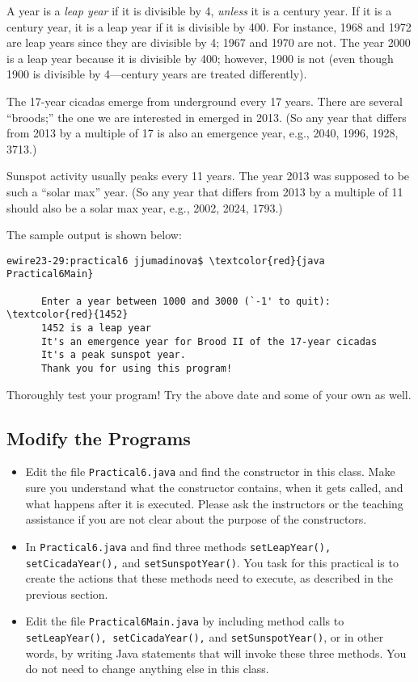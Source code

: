 \noindent A year is a {\em leap year} if it is divisible by 4, {\em unless} it is a century
year. If it is a century year, it is a leap year if it is divisible by 400. For instance,
1968 and 1972 are leap years since they are divisible by 4; 1967 and 1970 are not.
The year 2000 is a leap year because it is divisible by 400; however, 1900 is not (even
though 1900 is divisible by 4---century years are treated differently).

\noindent The 17-year cicadas emerge from underground every 17 years. There are several 
``broods;'' the one we are interested in emerged in 2013. (So any year that differs
from 2013 by a multiple of 17 is also an emergence year, e.g., 2040, 1996, 1928, 3713.)

\noindent Sunspot activity usually peaks every 11 years. The year 2013 was supposed to be such
a ``solar max'' year. (So any year that differs from 2013 by a multiple of 11 should
also be a solar max year, e.g., 2002, 2024, 1793.)


\noindent The sample output is shown below:
\begin{Verbatim}[commandchars=\\\{\}]
      ewire23-29:practical6 jjumadinova$ \textcolor{red}{java Practical6Main}
            
      Enter a year between 1000 and 3000 (`-1' to quit): \textcolor{red}{1452}
      1452 is a leap year
      It's an emergence year for Brood II of the 17-year cicadas
      It's a peak sunspot year.
      Thank you for using this program! 
\end{Verbatim}

\noindent Thoroughly test your program! Try the above date and some of your own as well.

\vspace*{-.1in}
\subsection*{Modify the Programs} 
\vspace*{-.05in}
\begin{itemize}
\item Edit the file {\tt Practical6.java} and find the constructor in this class. Make sure you understand what the constructor contains, when it gets called, and what happens after it is executed. Please ask the instructors or the teaching assistance if you are not clear about the purpose of the constructors. 
\item  In {\tt Practical6.java} and find three methods {\tt setLeapYear(), setCicadaYear(),} and {\tt  setSunspotYear()}. You task for this practical is to create the actions that these methods need to execute, as described in the previous section. 
\item Edit the file {\tt Practical6Main.java} by including method calls to {\tt setLeapYear(), setCicadaYear(),} and {\tt  setSunspotYear()}, or in other words, by writing Java statements that will invoke these three methods. You do not need to change anything else in this class.
\end{itemize}

